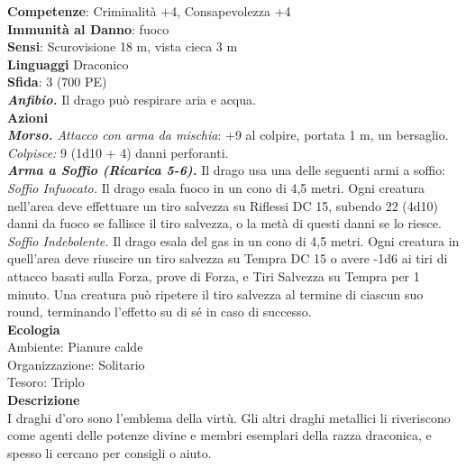 \begin{multicols}{2}
\textbf{Competenze}: Criminalità +4, Consapevolezza +4\\
\textbf{Immunità al Danno}: fuoco\\
\textbf{Sensi}: Scurovisione 18 m, vista cieca 3 m \\
\textbf{Linguaggi} Draconico\\
\textbf{Sfida}: 3 (700 PE)\smallskip\\
\emph{\textbf{Anfibio.}} Il drago può respirare aria e acqua.\\
\smallskip\textbf{Azioni}\\
\emph{\textbf{Morso.} Attacco con arma da mischia}: +9 al colpire, portata 1 m, un bersaglio.\\
\emph{Colpisce:} 9 (1d10 + 4) danni perforanti.\\
\emph{\textbf{Arma a Soffio (Ricarica 5-6).}} Il drago usa una delle seguenti armi a soffio:\\
\emph{Soffio Infuocato.} Il drago esala fuoco in un cono di 4,5 metri. Ogni creatura nell'area deve effettuare un tiro salvezza su Riflessi DC  15, subendo 22 (4d10) danni da fuoco se fallisce il tiro salvezza, o la metà di questi danni se lo riesce.\\
\emph{Soffio Indebolente.} Il drago esala del gas in un cono di 4,5 metri. Ogni creatura in quell'area deve riuscire un tiro salvezza su Tempra DC  15 o avere -1d6 ai tiri di attacco basati sulla Forza, prove di Forza, e Tiri Salvezza su Tempra per 1 minuto. Una creatura può ripetere il tiro salvezza al termine di ciascun suo round, terminando l'effetto su di sé in caso di successo.\\
\textbf{Ecologia}\\
Ambiente: Pianure calde\\
Organizzazione: Solitario\\
Tesoro: Triplo\\
\textbf{Descrizione}\\
I draghi d'oro sono l'emblema della virtù. Gli altri draghi metallici li riveriscono come agenti delle potenze divine e membri esemplari della razza draconica, e spesso li cercano per consigli o aiuto.\\


\end{multicols}

